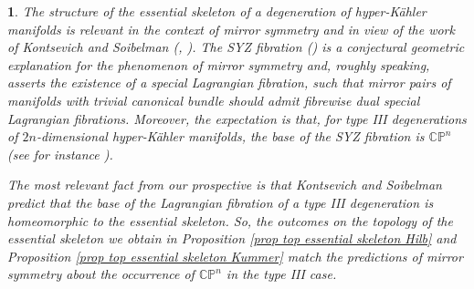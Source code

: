 \documentclass{amsart}%
\numberwithin{equation}{subsection}
\theoremstyle{plain2}
\theoremstyle{definition2}
\theoremstyle{stepstyle}
\theoremstyle{point}
\theoremstyle{subpoint}
\newtheorem{subpoint}[equation]{}%
\newcommand{\spa}[1]{\begin{subpoint}#1\end{subpoint}}           %
\newcommand{\CP}{\ensuremath{\mathbb{CP}}}
\begin{document}
\spa{The structure of the essential skeleton of a degeneration of hyper-K\"{a}hler manifolds is relevant in the context of mirror symmetry and in view of the work of Kontsevich and Soibelman (\cite{KontsevichSoibelmana}, \cite{KontsevichSoibelman}). The SYZ fibration (\cite{StromingerYauZaslow}) is a conjectural geometric explanation for the phenomenon of mirror symmetry and, roughly speaking, asserts the existence of a special Lagrangian fibration, such that mirror pairs of manifolds with trivial canonical bundle should admit fibrewise dual special Lagrangian fibrations. Moreover, the expectation is that, for type III degenerations of $2n$-dimensional hyper-K\"{a}hler manifolds, the base of the SYZ fibration is $\CP^n$ (see for instance \cite{Hwang}).

The most relevant fact from our prospective is that Kontsevich and Soibelman predict that the base of the Lagrangian fibration of a type III degeneration is homeomorphic to the essential skeleton. So, the outcomes on the topology of the essential skeleton we obtain in Proposition \ref{prop top essential skeleton Hilb} and Proposition \ref{prop top essential skeleton Kummer} match the predictions of mirror symmetry about the occurrence of $\CP^n$ in the type III case. 
}
\end{document}
